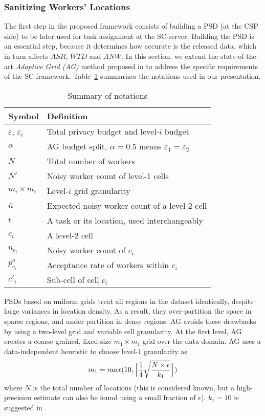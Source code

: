 \documentclass{USC-Thesis}
\renewcommand\bf\bfseries
\newcommand{\tn}{\tabularnewline}
\DeclarePairedDelimiter{\ceil}{\lceil}{\rceil}
\numberwithin{equation}{chapter}
\begin{document}
\subsubsection{Sanitizing Workers' Locations}
\label{sec:psd}

The first step in the proposed framework consists of building a PSD (at the CSP side) to be later used for task assignment at the SC-server. Building the PSD is an essential step, because it determines how accurate is the released data, which in turn affects $\mathit{ASR}$, $\mathit{WTD}$ and $\mathit{ANW}$. 
In this section, we extend the state-of-the-art {\em Adaptive Grid (AG)} method proposed in \cite{qardaji2012differentially} to address the specific requirements of the SC framework.
Table~\ref{tab:notation1} summarizes the notations used in our presentation.

\begin{table}
\begin{center}
\footnotesize
\begin{tabular}{ l | l}
\hline
{\bf Symbol} & {\bf Definition} \tn
\hline
$\varepsilon$, $\varepsilon_i$ & Total privacy budget and level-$i$ budget \tn
\hline
$\alpha$ & AG budget split, $\alpha=0.5$ means $\varepsilon_1=\varepsilon_2$  \tn
\hline
$N$ & Total number of workers \tn
\hline
$N'$ & Noisy worker count of level-1 cells \tn
\hline
$m_i\times m_i$ & Level-$i$ grid granularity \tn
\hline
$\bar{n}$ & Expected noisy worker count of a level-2 cell \tn
\hline
$t$ & A task or its location, used interchangeably \tn
\hline
$c_i$ & A level-2 cell \tn
\hline
$n_{c_i}$ & Noisy worker count of $c_i$ \tn
\hline
$p^a_{c_i}$ & Acceptance rate of workers within $c_i$ \tn
\hline
$c'_i$ & Sub-cell of cell $c_i$ \tn
\hline
\end{tabular}
\caption{Summary of notations}
\label{tab:notation1}
\end{center}
\end{table}

PSDs based on uniform grids treat all regions in the dataset identically, despite large variances in location density. As a result, they over-partition the space in sparse regions, and under-partition in dense regions. AG avoids these drawbacks by using a two-level grid and variable cell granularity. At the first level, AG creates a coarse-grained, fixed-size $m_1\times m_1$ grid over the data domain. AG uses a data-independent heuristic to choose level-$1$ granularity as
$$m_1=max(10,\ceil[\Big]{ \frac{1}{4}\sqrt{\frac{N \times \epsilon}{k_1}} })$$
where $N$ is the total number of locations (this is considered known, but a high-precision estimate can also be found using a small fraction of $\epsilon$). $k_1=10$ is suggested in \cite{qardaji2012differentially}.
\end{document}

